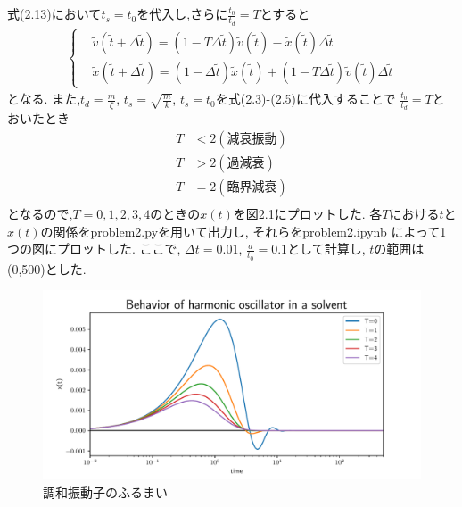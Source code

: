 \documentclass[a4paper,dvipdfmx]{jarticle}
\begin{document}
\subsection{}
\noindent

式(2.13)において$t_s=t_0$を代入し,さらに$\frac{t_0}{t_d}=T$とすると
\begin{subequations}
    \begin{align}
    \left\{
        \begin{aligned}
        & \tilde{v}(\tilde{t} + \Delta \tilde{t}) = \left(1 - T \Delta \tilde{t} \right) \tilde{v}(\tilde{t})
        - \tilde{x}(\tilde{t}) \Delta \tilde{t}\\
        & \tilde{x}(\tilde{t} + \Delta \tilde{t}) = (1 - \Delta \tilde{t} ) \tilde{x}(\tilde{t}) 
        + \left(1 - T \Delta \tilde{t} \right) \tilde{v}(\tilde{t}) \Delta \tilde{t}
        \end{aligned}
    \right. \tag{2.14}
    \end{align}
\end{subequations}
となる.
また,$t_d = \frac{m}{\zeta}$, $t_s = \sqrt{\frac{m}{k}}$, $t_s=t_0$を式(2.3)-(2.5)に代入することで
$\frac{t_0}{t_d}=T$とおいたとき
\begin{align*}
    T & < 2　　 (減衰振動) \tag{2.3}\\
    T & > 2　　 (過減衰) \tag{2.4}\\
    T & = 2　　 (臨界減衰) \tag{2.5}\\
\end{align*}
となるので,$T=0, 1, 2, 3, 4$のときの$x(t)$を図2.1にプロットした.
各$T$における$t$と$x(t)$の関係をproblem2.pyを用いて出力し, それらをproblem2.ipynb
によって1つの図にプロットした. 
ここで, $\Delta t=0.01$, $\frac{a}{t_0}=0.1$として計算し, $t$の範囲は(0,500)とした. 

\begin{figure}[H]
    \centering
    \includegraphics[scale=0.6]{./problem_2/problem2.pdf}
    \caption{調和振動子のふるまい}
\end{figure}
\clearpage
\end{document}
